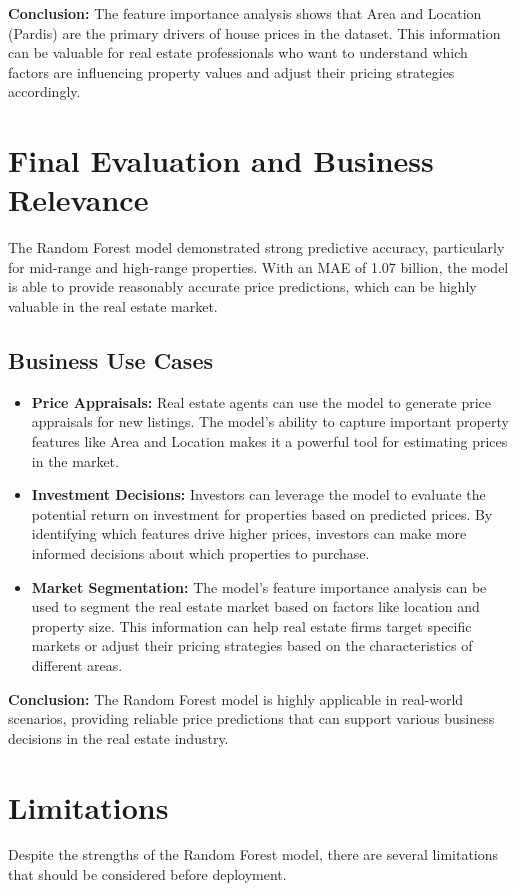 \documentclass{article}
\begin{document}
\textbf{Conclusion:} The feature importance analysis shows that Area and Location (Pardis) are the primary drivers of house prices in the dataset. This information can be valuable for real estate professionals who want to understand which factors are influencing property values and adjust their pricing strategies accordingly.

\section{Final Evaluation and Business Relevance}
The Random Forest model demonstrated strong predictive accuracy, particularly for mid-range and high-range properties. With an MAE of 1.07 billion, the model is able to provide reasonably accurate price predictions, which can be highly valuable in the real estate market.

\subsection{Business Use Cases}
\begin{itemize}
    \item \textbf{Price Appraisals:} Real estate agents can use the model to generate price appraisals for new listings. The model’s ability to capture important property features like Area and Location makes it a powerful tool for estimating prices in the market.
    \item \textbf{Investment Decisions:} Investors can leverage the model to evaluate the potential return on investment for properties based on predicted prices. By identifying which features drive higher prices, investors can make more informed decisions about which properties to purchase.
    \item \textbf{Market Segmentation:} The model’s feature importance analysis can be used to segment the real estate market based on factors like location and property size. This information can help real estate firms target specific markets or adjust their pricing strategies based on the characteristics of different areas.
\end{itemize}

\textbf{Conclusion:} The Random Forest model is highly applicable in real-world scenarios, providing reliable price predictions that can support various business decisions in the real estate industry.

\section{Limitations}
Despite the strengths of the Random Forest model, there are several limitations that should be considered before deployment.
\end{document}
